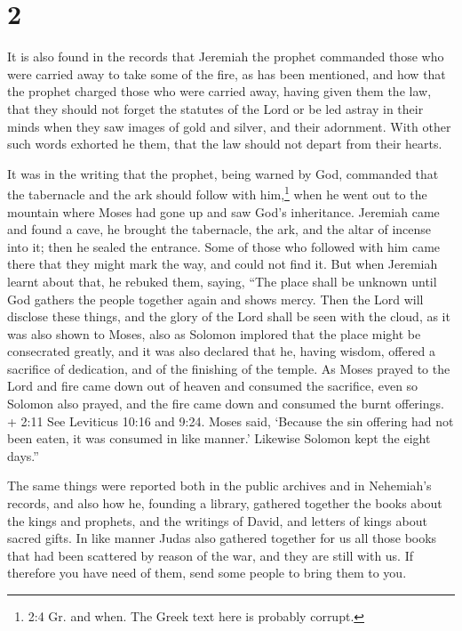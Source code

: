 \hypertarget{section-1}{%
\section{2}\label{section-1}}

 It is also found in the records that Jeremiah the prophet
commanded those who were carried away to take some of the fire, as has
been mentioned,  and how that the prophet charged those who
were carried away, having given them the law, that they should not
forget the statutes of the Lord or be led astray in their minds when
they saw images of gold and silver, and their adornment. 
With other such words exhorted he them, that the law should not depart
from their hearts.

 It was in the writing that the prophet, being warned by
God, commanded that the tabernacle and the ark should follow with
him,\footnote{2:4 Gr. and when. The Greek text here is probably corrupt.}
when he went out to the mountain where Moses had gone up and saw God's
inheritance.  Jeremiah came and found a cave, he brought the
tabernacle, the ark, and the altar of incense into it; then he sealed
the entrance.  Some of those who followed with him came
there that they might mark the way, and could not find it. 
But when Jeremiah learnt about that, he rebuked them, saying, ``The
place shall be unknown until God gathers the people together again and
shows mercy.  Then the Lord will disclose these things, and
the glory of the Lord shall be seen with the cloud, as it was also shown
to Moses, also as Solomon implored that the place might be consecrated
greatly,  and it was also declared that he, having wisdom,
offered a sacrifice of dedication, and of the finishing of the temple.
 As Moses prayed to the Lord and fire came down out of
heaven and consumed the sacrifice, even so Solomon also prayed, and the
fire came down and consumed the burnt offerings.  + 2:11
See Leviticus 10:16 and 9:24. Moses said, `Because the sin offering had
not been eaten, it was consumed in like manner.'  Likewise
Solomon kept the eight days.''

 The same things were reported both in the public archives
and in Nehemiah's records, and also how he, founding a library, gathered
together the books about the kings and prophets, and the writings of
David, and letters of kings about sacred gifts.  In like
manner Judas also gathered together for us all those books that had been
scattered by reason of the war, and they are still with us.
 If therefore you have need of them, send some people to
bring them to you.

